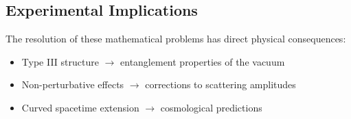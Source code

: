 \subsection{Experimental Implications}

The resolution of these mathematical problems has direct physical consequences:
\begin{itemize}
    \item Type III structure $\to$ entanglement properties of the vacuum
    \item Non-perturbative effects $\to$ corrections to scattering amplitudes
    \item Curved spacetime extension $\to$ cosmological predictions
\end{itemize}
